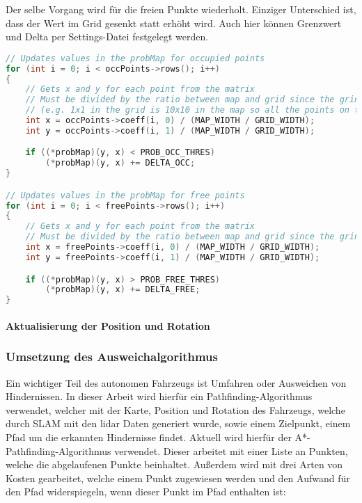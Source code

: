 Der selbe Vorgang wird für die freien Punkte wiederholt.
Einziger Unterschied ist, dass der Wert im Grid gesenkt statt erhöht wird.
Auch hier können Grenzwert und Delta per Settings-Datei festgelegt werden.

\begin{lstlisting}[caption={Auschnitt aus updateProbMap},label={lst:update-prob-map},language={C++}]
// Updates values in the probMap for occupied points
for (int i = 0; i < occPoints->rows(); i++)
{
    // Gets x and y for each point from the matrix
    // Must be divided by the ratio between map and grid since the grind is a fraction of the size to allow for some error
    // (e.g. 1x1 in the grid is 10x10 in the map so all the points on the map that lay in this 10x10 area will change the value of probability at that single point in the grid)
    int x = occPoints->coeff(i, 0) / (MAP_WIDTH / GRID_WIDTH);
    int y = occPoints->coeff(i, 1) / (MAP_WIDTH / GRID_WIDTH);

    if ((*probMap)(y, x) < PROB_OCC_THRES)
        (*probMap)(y, x) += DELTA_OCC;
}

// Updates values in the probMap for free points
for (int i = 0; i < freePoints->rows(); i++)
{
    // Gets x and y for each point from the matrix
    // Must be divided by the ratio between map and grid since the grind is a fraction of the size to allow for some error
    int x = freePoints->coeff(i, 0) / (MAP_WIDTH / GRID_WIDTH);
    int y = freePoints->coeff(i, 1) / (MAP_WIDTH / GRID_WIDTH);

    if ((*probMap)(y, x) > PROB_FREE_THRES)
        (*probMap)(y, x) += DELTA_FREE;
}
\end{lstlisting}

\paragraph{Aktualisierung der Position und Rotation}
\label{position_update}




\subsubsection{Umsetzung des Ausweichalgorithmus}

Ein wichtiger Teil des autonomen Fahrzeugs ist Umfahren oder Ausweichen von Hindernissen. In dieser Arbeit wird hierfür ein Pathfinding-Algorithmus verwendet, welcher mit der Karte, Position und Rotation des Fahrzeugs, welche durch SLAM mit den \ac{lidar} Daten generiert wurde, sowie einem Zielpunkt, einem Pfad um die erkannten Hindernisse findet. Aktuell wird hierfür der A*-Pathfinding-Algorithmus verwendet. Dieser arbeitet mit einer Liste an Punkten, welche die abgelaufenen Punkte beinhaltet. Außerdem wird mit drei Arten von Kosten gearbeitet, welche einem Punkt zugewiesen werden und den Aufwand für den Pfad widerspiegeln, wenn dieser Punkt im Pfad enthalten ist:


